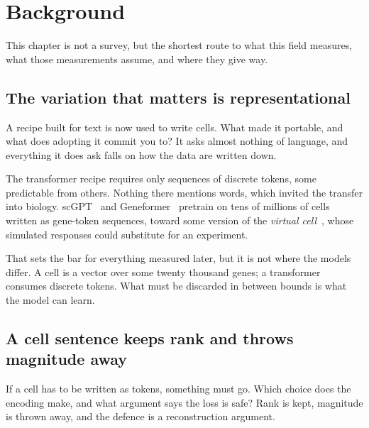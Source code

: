 
\chapter{Background}
\label{sec:litreview}

\noindent
This chapter is not a survey, but the shortest route to what this field measures,
what those measurements assume, and where they give way.

\section{The variation that matters is representational}
\label{sec:lit-foundation}
\framedecl{-}

\begin{question}
A recipe built for text is now used to write cells. What made it portable, and
what does adopting it commit you to? It asks almost nothing of language, and
everything it does ask falls on how the data are written down.
\end{question}

\noindent
The transformer recipe requires only sequences of discrete tokens, some
predictable from others. Nothing there mentions words, which invited the transfer
into biology. scGPT~\cite{scgpt} and Geneformer~\cite{geneformer} pretrain on
tens of millions of cells written as gene-token sequences, toward some version of
the \emph{virtual cell}~\cite{bunne}, whose simulated responses could substitute
for an experiment.

That sets the bar for everything measured later, but it is not where the models
differ. A cell is a vector over some twenty thousand genes; a transformer
consumes discrete tokens. What must be discarded in between bounds is what the model
can learn.

\section{A cell sentence keeps rank and throws magnitude away}
\label{sec:lit-c2s}
\framedecl{-}

\begin{question}
If a cell has to be written as tokens, something must go. Which choice does the
encoding make, and what argument says the loss is safe? Rank is kept, magnitude
is thrown away, and the defence is a reconstruction argument.
\end{question}

